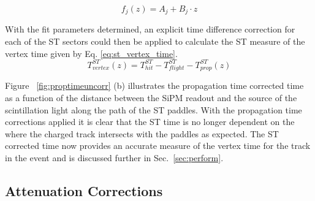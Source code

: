 	\begin{equation} \label{eq:pt_func_form}
		f_{j}(z) = A_{j} + B_{j} \cdot z
	\end{equation}
	
With the fit parameters determined, an explicit time difference correction for each of the ST sectors could then be applied to calculate the ST measure of the vertex time given by Eq. \ref{eq:st_vertex_time}.
	\begin{equation}\label{eq:st_vertex_time}
	 	T^{ST}_{vertex}(z) = T^{ST}_{hit} - T^{ST}_{flight} - T^{ST}_{prop}(z)
	\end{equation} 
	
Figure ~\ref{fig:proptimeuncorr} (b) illustrates the propagation time corrected time as a function of the distance between the SiPM readout and the source of the scintillation light along the path of the ST paddles.
With the propagation time corrections applied it is clear that the ST time is no longer dependent on the where the charged track intersects with the paddles as expected.  The ST corrected time now provides an accurate measure of the vertex time for the track in the event and is discussed further in Sec.~\ref{sec:perform}.

\subsection{Attenuation Corrections} \label{sec:calib_ac}

